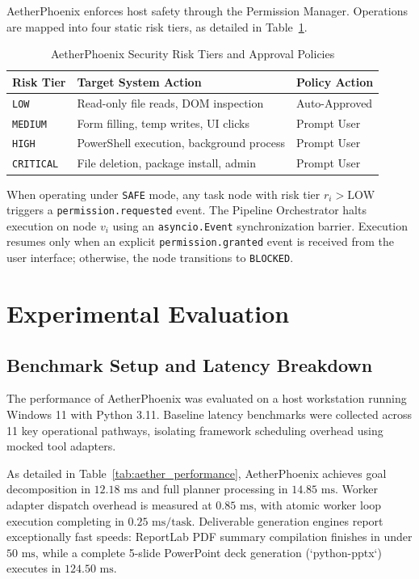 \documentclass[conference]{IEEEtran}
\begin{document}
AetherPhoenix enforces host safety through the Permission Manager. Operations are mapped into four static risk tiers, as detailed in Table~\ref{tab:permission_matrix_aether}.

\begin{table}[htbp]
\caption{AetherPhoenix Security Risk Tiers and Approval Policies}
\label{tab:permission_matrix_aether}
\centering
\begin{tabular}{p{1.4cm} p{4.2cm} p{1.8cm}}
\toprule
\textbf{Risk Tier} & \textbf{Target System Action} & \textbf{Policy Action} \\
\midrule
\texttt{LOW} & Read-only file reads, DOM inspection & Auto-Approved \\
\texttt{MEDIUM} & Form filling, temp writes, UI clicks & Prompt User \\
\texttt{HIGH} & PowerShell execution, background process & Prompt User \\
\texttt{CRITICAL} & File deletion, package install, admin & Prompt User \\
\bottomrule
\end{tabular}
\end{table}

When operating under \texttt{SAFE} mode, any task node with risk tier $r_i > \text{LOW}$ triggers a \texttt{permission.requested} event. The Pipeline Orchestrator halts execution on node $v_i$ using an \texttt{asyncio.Event} synchronization barrier. Execution resumes only when an explicit \texttt{permission.granted} event is received from the user interface; otherwise, the node transitions to \texttt{BLOCKED}.

\section{Experimental Evaluation}
\label{sec:experiments}

\subsection{Benchmark Setup and Latency Breakdown}
The performance of AetherPhoenix was evaluated on a host workstation running Windows 11 with Python 3.11. Baseline latency benchmarks were collected across 11 key operational pathways, isolating framework scheduling overhead using mocked tool adapters.

As detailed in Table~\ref{tab:aether_performance}, AetherPhoenix achieves goal decomposition in $12.18\text{ ms}$ and full planner processing in $14.85\text{ ms}$. Worker adapter dispatch overhead is measured at $0.85\text{ ms}$, with atomic worker loop execution completing in $0.25\text{ ms/task}$. Deliverable generation engines report exceptionally fast speeds: ReportLab PDF summary compilation finishes in under $50\text{ ms}$, while a complete 5-slide PowerPoint deck generation (`python-pptx`) executes in $124.50\text{ ms}$.
\end{document}
